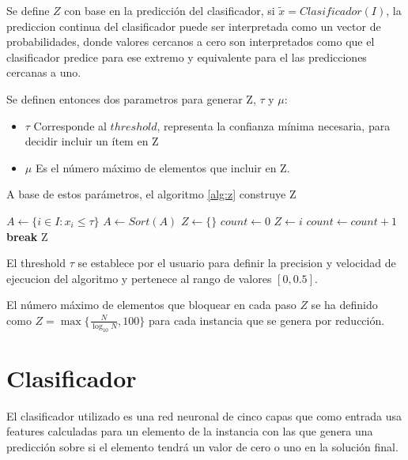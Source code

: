 \documentclass[spanish, a4paper, 12pt, openany,final]{book}
\begin{document}
Se define $Z$ con base en la predicción del clasificador, si $\tilde{x} = Clasificador(I)$, la prediccion continua del clasificador puede ser interpretada como un vector de probabilidades, donde valores cercanos a cero son interpretados como que el clasificador predice para ese extremo y equivalente para el las predicciones cercanas a uno.

Se definen entonces dos parametros para generar Z, $\tau$ y $\mu$:

\begin{itemize}
	\item $\tau$ Corresponde al $threshold$, representa la confianza mínima necesaria, para decidir incluir un ítem en Z
	\item $\mu$ Es el número máximo de elementos que incluir en Z.
\end{itemize}

A base de estos parámetros, el algoritmo \ref{alg:z} construye Z

\begin{algorithm}[H]
	\caption{$Z(\tilde{x},\tau,\mu)$}\label{alg:z}
	\begin{algorithmic}
		\State $A \gets \{ i \in I: x_i \leq \tau \}$
		\State $A \gets Sort(A)$  
		\State $Z \gets \{\}$	  
		\State $count \gets 0$
				  
			\State $Z \gets i$
			\State $count \gets count + 1$
				\State \textbf{break}
			\EndIf
		\EndFor
		\State Z
	\end{algorithmic}
\end{algorithm}

El threshold $\tau$ se establece por el usuario para definir la precision y velocidad de ejecucion del algoritmo y pertenece al rango de valores $[0,0.5]$.

El número máximo de elementos que bloquear en cada paso $Z$ se ha definido como $Z = \max\{\frac{N}{\log_{10}{N}},100\}$ para cada instancia que se genera por reducción.

\section{Clasificador}

El clasificador utilizado es una red neuronal de cinco capas que como entrada usa features calculadas para un elemento de la instancia con las que genera una predicción sobre si el elemento tendrá un valor de cero o uno en la solución final.
\end{document}
